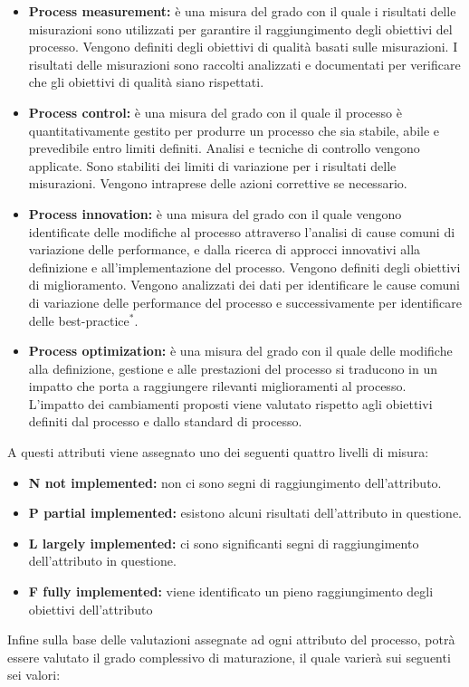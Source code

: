 \documentclass[11pt,a4paper]{article}
\begin{document}
{\begin{itemize}
	\item \textbf{Process measurement:} è una misura del grado con il quale i risultati delle misurazioni sono utilizzati per garantire il raggiungimento degli obiettivi del processo. Vengono definiti degli obiettivi di qualità basati sulle misurazioni. I risultati delle misurazioni sono raccolti analizzati e documentati per verificare che gli obiettivi di qualità siano rispettati.
	\item \textbf{Process control:} è una misura del grado con il quale il processo è quantitativamente gestito per produrre un processo che sia stabile, abile e prevedibile entro limiti definiti. Analisi e tecniche di controllo vengono applicate. Sono stabiliti dei limiti di variazione per i risultati delle misurazioni. Vengono intraprese delle azioni correttive se necessario. 
	\item \textbf{Process innovation:} è una misura del grado con il quale vengono identificate delle modifiche al processo attraverso l'analisi di cause comuni di variazione delle performance, e dalla ricerca di approcci innovativi alla definizione e all'implementazione del processo. Vengono definiti degli obiettivi di miglioramento. Vengono analizzati dei dati per identificare le cause comuni di variazione delle performance del processo e successivamente per identificare delle best-practice$^*$.
	\item \textbf{Process optimization:} è una misura del grado con il quale delle modifiche alla definizione, gestione e alle prestazioni del processo si traducono in un impatto che porta a raggiungere rilevanti miglioramenti al processo. L'impatto dei cambiamenti proposti viene valutato rispetto agli obiettivi definiti dal processo e dallo standard di processo.
\end{itemize}
A questi attributi viene assegnato uno dei seguenti quattro livelli di misura:
\begin{itemize}
	\item \textbf{N not implemented:} non ci sono segni di raggiungimento dell'attributo.
	\item \textbf{P partial implemented:} esistono alcuni risultati dell'attributo in questione.
	\item \textbf{L largely implemented:} ci sono significanti segni di raggiungimento dell'attributo in questione.
	\item \textbf{F fully implemented:} viene identificato un pieno raggiungimento degli obiettivi dell'attributo
\end{itemize}
Infine sulla base delle valutazioni assegnate ad ogni attributo del processo, potrà essere valutato il grado complessivo di maturazione, il quale varierà sui seguenti sei valori:
}
\end{document}
